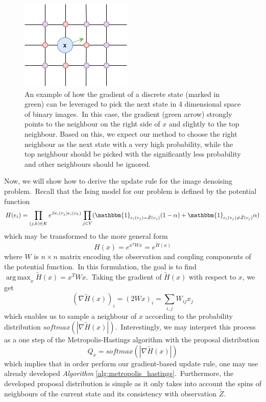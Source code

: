 \documentclass[shortabstract, english, lic]{iithesis}
\DeclareMathOperator*{\argmax}{arg\,max}
\theoremstyle{default_theorem_style}\newtheorem{theorem}{Theorem}
\theoremstyle{default_theorem_style}\newtheorem{definition}{Definition}
\begin{document}
\begin{figure}[t]
\centering
\includegraphics[scale=1.0]{gradient_example}
\caption{An example of how the gradient of a discrete state (marked in green) can be leveraged to pick the next state
in 4 dimensional space of binary images.\ In this case, the gradient (green arrow) strongly points to the neighbour on
the right side of $x$ and slightly to the top neighbour. Based on this, we expect our method to choose the right
neighbour as the next state with a very high probability, while the top neighbour should be picked with the
significantly less probability and other neighbours should be ignored.}
\label{fig:gradient_example}
\end{figure}

\noindent Now, we will show how to derive the update rule for the image denoising problem.\ Recall that the Ising model
for our problem is defined by the potential function
$$
H(e_i) = \prod\limits_{(j, k) \in K} e^{\beta e_i(v_j)e_i(v_k)}
\prod\limits_{j \in V}( \mathbbm{1}_{e_i(v_j) = \tilde{Z}(v_j)}(1 - \alpha) +
\mathbbm{1}_{e_i(v_j) \neq \tilde{Z}(v_j)}\alpha)
$$
which may be transformed to the more general form
$$
H(x) = e^{x^T W x} = e^{\tilde{H}(x)}
$$
where $W$ is $n \times n$ matrix encoding the observation and coupling components of the potential function.\ In
this formulation, the goal is to find $\argmax_x \tilde{H}(x) = x^T W x$.\ Taking the gradient of
$\tilde{H}(x)$ with respect to $x$, we get
$$
(\nabla \tilde{H}(x))_i = (2W x)_i = \sum_{i, j} W_{ij} x_j
$$
which enables us to sample a neighbour of $x$ according to the probability distribution
$softmax(|\nabla \tilde{H}(x)|)$.\ Interestingly, we may interpret this process as a one step of the
Metropolis-Hastings algorithm with the proposal distribution
$$
Q_x = softmax(|\nabla \tilde{H}(x)|)
$$
which implies that in order perform our gradient-based update rule, one may use already developed
\textit{Algorithm} \ref{alg:metropolis_hastings}.\ Furthermore, the developed proposal distribution is simple as
it only takes into account the spins of neighbours of the current state and its consistency with observation
$\tilde{Z}$.
\end{document}
